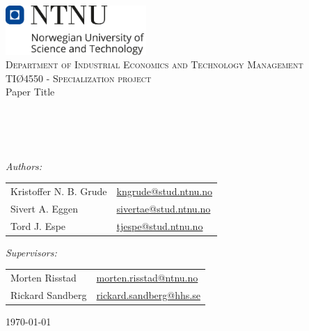 \begin{titlepage}

\vbox{ }

\vbox{ }

\begin{center}
\includegraphics[width=0.40\textwidth]{Images/ntnu logo.png}\\[1cm]
\textsc{\Large Department of Industrial Economics and Technology Management}\\[1cm]

\textsc{\Large TIØ4550 - Specialization project}\\[0.5cm]


\def\checktitle{Paper Title}
\ifx\TITLE\checktitle
\fi

\vbox{ }
\HRule \\[0.4cm]
{ \huge \bfseries \TITLE }\\[0.4cm]
\HRule \\[1.5cm]
\large


\emph{Authors:}\\
\begin{center}
\begin{tabular}{>{\raggedright}p{4.1cm} p{4.1cm}}  
    Kristoffer N. B. Grude & \href{mailto:kngrude@stud.ntnu.no}{kngrude@stud.ntnu.no} \\
    Sivert A. Eggen & \href{mailto:sivertae@stud.ntnu.no}{sivertae@stud.ntnu.no} \\
    Tord J. Espe & \href{mailto:tjespe@stud.ntnu.no}{tjespe@stud.ntnu.no} \\
\end{tabular}
\end{center}

\emph{Supervisors:}\\
\begin{center}
\small  %
\begin{tabular}{>{\raggedright}p{4cm} p{4cm}}  
    Morten Risstad & \href{mailto:morten.risstad@ntnu.no}{morten.risstad@ntnu.no} \\
    Rickard Sandberg & \href{mailto:rickard.sandberg@hhs.se}{rickard.sandberg@hhs.se} \\
\end{tabular}
\end{center}


\vfill
{\large \today}
\end{center}
\end{titlepage}




